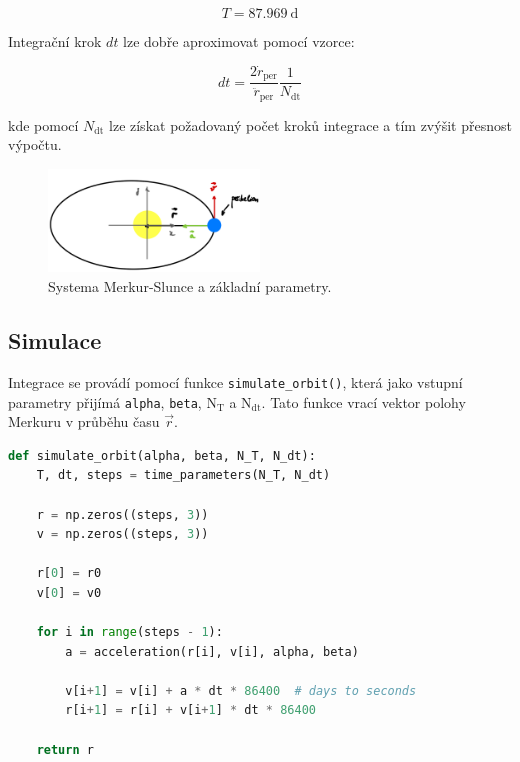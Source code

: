 \documentclass[a4paper,11pt,twocolumn]{article}
\begin{document}
            \begin{equation}
                T = 87.969 ~\text{d}
                \label{eq:mer_period}
            \end{equation}  

            Integrační krok $dt$ lze dobře aproximovat pomocí vzorce:

            \begin{equation}
                dt = \frac{2 \dot{r}_{\text{per}}}{\ddot{r}_{\text{per}}} \frac{1}{N_{\text{dt}}}
                \label{eq:dt}
            \end{equation}

            kde pomocí $N_{\text{dt}}$ lze získat požadovaný počet kroků integrace a tím zvýšit přesnost výpočtu.

            \begin{figure}
                \centering
                \includegraphics[width=0.5\textwidth]{ms_scheme.png}
                \caption{Systema Merkur-Slunce a základní parametry.}
                \label{fig:ms_scheme}
            \end{figure}

        \subsection{Simulace}
            Integrace se provádí pomocí funkce \texttt{simulate\_orbit()}, která jako vstupní parametry přijímá \texttt{alpha}, \texttt{beta}, \texttt{$\text{N}_\text{T}$} a \texttt{$\text{N}_\text{dt}$}. Tato funkce vrací vektor polohy Merkuru v průběhu času $\vec{r}$. 
            
            
\begin{lstlisting}[language=Python, caption={Simulace oběhu}]      
def simulate_orbit(alpha, beta, N_T, N_dt):
    T, dt, steps = time_parameters(N_T, N_dt)
    
    r = np.zeros((steps, 3))
    v = np.zeros((steps, 3))
    
    r[0] = r0
    v[0] = v0
    
    for i in range(steps - 1):
        a = acceleration(r[i], v[i], alpha, beta)

        v[i+1] = v[i] + a * dt * 86400  # days to seconds
        r[i+1] = r[i] + v[i+1] * dt * 86400

    return r    
\end{lstlisting}
            
\end{document}
